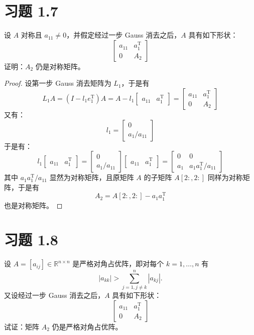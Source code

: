 \documentclass{article}
\newcommand{\T}{\mathrm{T}}
\newcommand{\vecTwo}[2]{
  \begin{bmatrix}
    #1 \\
    #2
\end{bmatrix}}
\newcommand{\vecTwoH}[2]{
  \begin{bmatrix}
    #1 & #2
  \end{bmatrix}
}
\begin{document}
\section{习题 1.7}
设 $A$ 对称且 $a_{11}\neq 0$，并假定经过一步 Gauss 消去之后，$A$ 具有如下形状：
\[
  \begin{bmatrix}
    a_{11} & a_1^{\T} \\
    0 & A_2
  \end{bmatrix}
\]
证明：$A_2$ 仍是对称矩阵。

\begin{proof}
  设第一步 Gauss 消去矩阵为 $L_1$，于是有
  \[
    L_1 A = (I - l_1 e_1^{\T}) A = A - l_1
    \begin{bmatrix}
      a_{11} & a_{1}^{\T}
    \end{bmatrix} =
    \begin{bmatrix}
      a_{11} & a_1^{\T} \\
      0 & A_2
    \end{bmatrix}
  \]
  又有：
  \[
    l_1 = \vecTwo{0}{a_1 / a_{11}}
  \]
  于是有：
  \[
    l_1 \vecTwoH{a_{11}}{a_1^{\T}}
    = \vecTwo{0}{a_1 / a_{11}} \vecTwoH{a_{11}}{a_1^{\T}} =
    \begin{bmatrix}
      0 & 0 \\
      a_1 & a_1 a_1^{\T} / a_{11}
    \end{bmatrix}
  \]
  其中 $a_1 a_1^{\T} / a_{11}$ 显然为对称矩阵，且原矩阵 $A$ 的子矩阵 $A[2:,2:]$ 同样为对称矩阵，于是有
  \[
    A_2 = A[2:,2:] - a_1 a_1^{\T}
  \]
  也是对称矩阵。

\end{proof}

\section{习题 1.8}
设 $A=[a_{ij}]\in\mathbb{R}^{n\times n}$ 是严格对角占优阵，即对每个 $k=1,\dots,n$ 有
\[
  |a_{kk}|>\sum_{j=1,j\neq k}^n |a_{kj}|.
\]
又设经过一步 Gauss 消去之后，$A$ 具有如下形状：
\[
  \begin{bmatrix}
    a_{11} & a_1^{\mathrm{T}} \\
    0 & A_2
  \end{bmatrix}
\]
试证：矩阵 $A_2$ 仍是严格对角占优阵。
\end{document}
